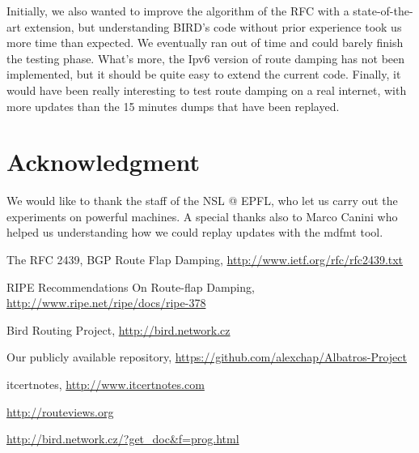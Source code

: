 \documentclass[a4paper,english]{IEEEtran}
\begin{document}
Initially, we also wanted to improve the algorithm of the RFC with a state-of-the-art extension, but understanding 
BIRD's code without prior experience took us more time than expected. We eventually ran
out of time and could barely finish the testing phase.
What's more, the Ipv6 version of route damping has not been implemented, but it should be quite easy to extend the current code.
Finally, it would have been really interesting to test route damping on a real internet, with more updates
than the 15 minutes dumps that have been replayed.

\section*{Acknowledgment}
We would like to thank the staff of the NSL @ EPFL, who let us carry out the experiments on powerful machines. 
A special thanks also to Marco Canini who helped us understanding how we could replay updates with the mdfmt tool.

\begin{thebibliography}{6}

The RFC 2439, BGP Route Flap Damping, \href{http://www.ietf.org/rfc/rfc2439.txt}{http://www.ietf.org/rfc/rfc2439.txt}

 RIPE Recommendations On Route-flap
Damping, \href{http://www.ripe.net/ripe/docs/ripe-378}{http://www.ripe.net/ripe/docs/ripe-378}

Bird Routing Project, \href{http://bird.network.cz}{http://bird.network.cz}

Our publicly available repository, \href{https://github.com/alexchap/Albatros-Project}{https://github.com/alexchap/Albatros-Project}

itcertnotes, \href{www.itcertnotes.com}{http://www.itcertnotes.com}

\href{http://routeviews.org}{http://routeviews.org} 

\href{http://bird.network.cz/?get\_doc\&f=prog.html}{http://bird.network.cz/?get\_doc\&f=prog.html}

\end{thebibliography}
\end{document}
